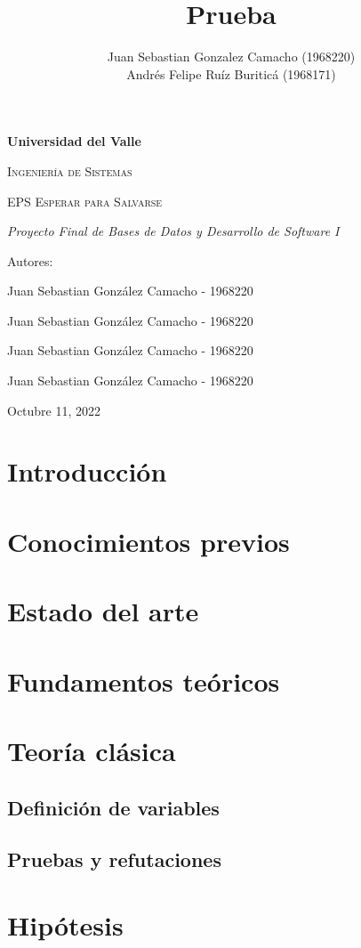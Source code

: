 \documentclass[12pt,a4paper]{article}
\author{Juan Sebastian Gonzalez Camacho (1968220)\\
Andrés Felipe Ruíz Buriticá (1968171)}
\title{Prueba}
\begin{document}
\begin{titlepage}
\centering
{\bfseries\LARGE Universidad del Valle \par}
\vspace{1cm}
{\scshape\Large Ingeniería de Sistemas \par}
\vspace{3cm}
{\scshape\Huge EPS Esperar para Salvarse \par}
\vspace{3cm}
{\itshape\Large Proyecto Final de Bases de Datos y Desarrollo de Software I \par}
\vfill
{\Large Autores: \par}
{\Large Juan Sebastian González Camacho - 1968220 \par}
{\Large Juan Sebastian González Camacho - 1968220 \par}
{\Large Juan Sebastian González Camacho - 1968220 \par}
{\Large Juan Sebastian González Camacho - 1968220 \par}
\vfill
{\Large Octubre 11, 2022 \par}
\end{titlepage}
\tableofcontents
\section{Introducción}
\section{Conocimientos previos}
\section{Estado del arte}
\section{Fundamentos teóricos}
\section{Teoría clásica}
\subsection{Definición de variables}
\subsection{Pruebas y refutaciones}
\section{Hipótesis}
\end{document}

